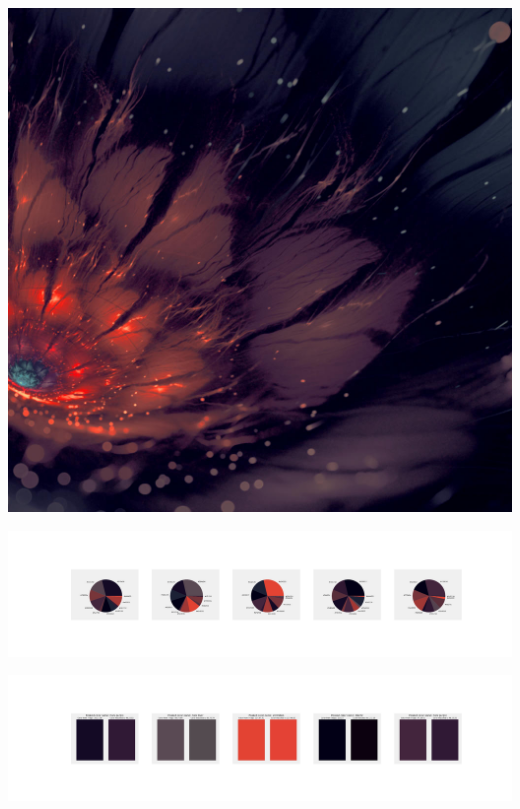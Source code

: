 \documentclass[11pt]{article}
\begin{document}
\begin{landscape}
    \begin{center}
    \includegraphics[width=\textwidth]{./nbimg/file (410).jpg}
    \end{center}

    \begin{center}
    \includegraphics[width=250mm]{./nbimg/pie-346.jpg}
    \end{center}

    \begin{center}
    \includegraphics[width=250mm]{./nbimg/peak-346.jpg}
    \end{center}
    


\end{landscape}
\end{document}
